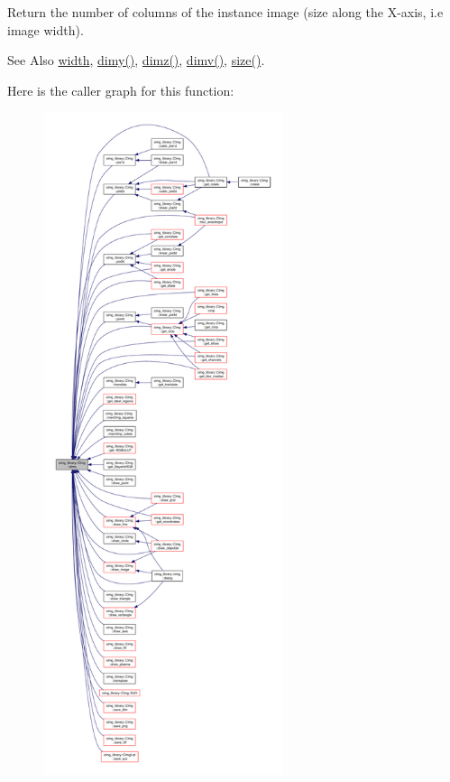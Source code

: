 Return the number of columns of the instance image (size along the X-\/axis, i.\-e image width). 

\begin{DoxySeeAlso}{See Also}
\hyperlink{structcimg__library_1_1_c_img_a5fb74a7776210bb99fd6755319ade13f}{width}, \hyperlink{structcimg__library_1_1_c_img_aa1e128f9d950b39ed312eb368741970c}{dimy()}, \hyperlink{structcimg__library_1_1_c_img_aba56e96a615d71ed9a71009768fc4b75}{dimz()}, \hyperlink{structcimg__library_1_1_c_img_ad30f8300f32a94a80e1e06c84a45de49}{dimv()}, \hyperlink{structcimg__library_1_1_c_img_a4f22f4188289724c853ed6a12b0a2e1e}{size()}. 
\end{DoxySeeAlso}


Here is the caller graph for this function\-:
\nopagebreak
\begin{figure}[H]
\begin{center}
\leavevmode
\includegraphics[height=550pt]{structcimg__library_1_1_c_img_abf1a3c383880a20428b2ea9d22f3c06e_icgraph}
\end{center}
\end{figure}


